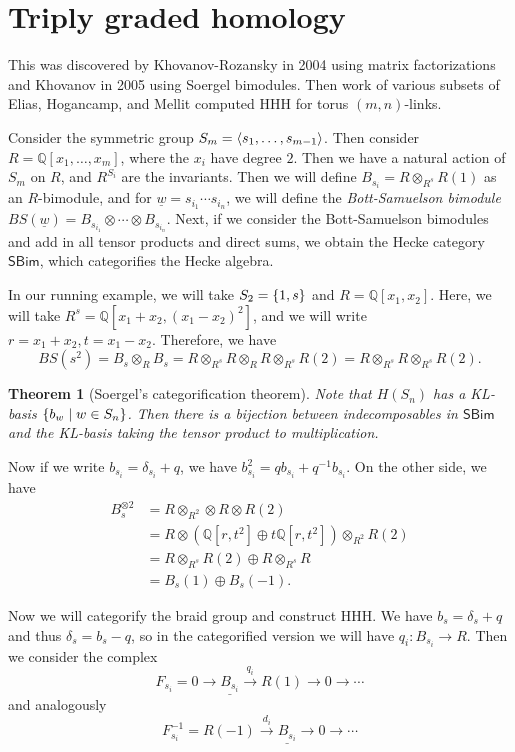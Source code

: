 \documentclass[leqno, openany]{memoir}
\newtheorem{thm}{Theorem}[section]
\theoremstyle{definition}
\theoremstyle{remark}
\theoremstyle{plain}
\theoremstyle{definition}
\theoremstyle{remark}
\newcommand{\Q}{\mathbb{Q}}
\newcommand{\ms}[1]{\mathsf{#1}}
\newcommand{\ul}[1]{\underline{#1}}
\newcommand{\1}{\mathbf{1}}
\newcommand{\2}{\mathbf{2}}
\newcommand{\3}{\mathbf{3}}
\begin{document}
\section{Triply graded homology}%
\label{sec:triply_graded_homology}

This was discovered by Khovanov-Rozansky in 2004 using matrix factorizations and Khovanov in 2005 using Soergel bimodules. Then work of various subsets of Elias, Hogancamp, and Mellit computed HHH for torus $(m,n)$-links.

Consider the symmetric group $S_m = \ev{s_1, \ldots, s_{m-1}}$. Then consider $R = \Q[x_1, \ldots, x_m]$, where the $x_i$ have degree $2$. Then we have a natural action of $S_m$ on $R$, and $R^{S_i}$ are the invariants. Then we will define $B_{s_i} = R \otimes_{R^s} R(1)$ as an $R$-bimodule, and for $\ul{w} = s_{i_1} \cdots s_{i_n}$, we will define the \textit{Bott-Samuelson bimodule} $BS(\ul{w}) = B_{s_{i_1}} \otimes \cdots \otimes B_{s_{i_n}}$. Next, if we consider the Bott-Samuelson bimodules and add in all tensor products and direct sums, we obtain the Hecke category $\ms{SBim}$, which categorifies the Hecke algebra.

In our running example, we will take $S_2 = \qty{1, s}$ and $R = \Q[x_1, x_2]$. Here, we will take $R^s = \Q[x_1+x_2, (x_1-x_2)^2]$, and we will write $r = x_1+x_2, t = x_1-x_2$. Therefore, we have
\[ BS(s^2) = B_s \otimes_R B_s = R \otimes_{R^s} R \otimes_R R \otimes_{R^s} R(2) = R \otimes_{R^s} R \otimes_{R^s} R(2). \]

\begin{thm}[Soergel's categorification theorem]
    Note that $H(S_n)$ has a KL-basis $\qty{b_w \mid w \in S_n}$. Then there is a bijection between indecomposables in $\ms{SBim}$ and the KL-basis taking the tensor product to multiplication.
\end{thm}

Now if we write $b_{s_i} = \delta_{s_i} + q$, we have $b_{s_i}^2 = q b_{s_i} + q^{-1} b_{s_i}$. On the other side, we have
\begin{align*}
    B_s^{\otimes 2} &= R \otimes_{R^2} \otimes R \otimes R(2) \\
    &= R \otimes (\Q[r,t^2] \oplus t \Q[r,t^2]) \otimes_{R^2} R(2) \\
    &= R \otimes_{R^s} R(2) \oplus R \otimes_{R^s} R \\
    &= B_s(1) \oplus B_s(-1).
\end{align*}

Now we will categorify the braid group and construct HHH. We have $b_s = \delta_s + q$ and thus $\delta_s = b_s - q$, so in the categorified version we will have $q_i \colon B_{s_i} \to R$. Then we consider the complex
\[ F_{s_i} = 0 \to \ul{B_{s_i}} \xrightarrow{q_i} R(1) \to 0 \to \cdots \]
and analogously
\[ F_{s_i}^{-1} = R(-1) \xrightarrow{d_i} \ul{B_{s_i}} \to 0 \to \cdots \]
\end{document}
